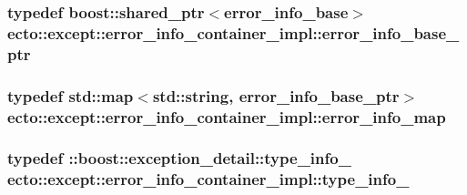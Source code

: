\subsubsection[{error\+\_\+info\+\_\+base\+\_\+ptr}]{\setlength{\rightskip}{0pt plus 5cm}typedef boost\+::shared\+\_\+ptr$<${\bf error\+\_\+info\+\_\+base}$>$ {\bf ecto\+::except\+::error\+\_\+info\+\_\+container\+\_\+impl\+::error\+\_\+info\+\_\+base\+\_\+ptr}\hspace{0.3cm}{\ttfamily [private]}}\label{classecto_1_1except_1_1error__info__container__impl_a9fbca0758380cb123f790aee77d1d4d8}
\hypertarget{classecto_1_1except_1_1error__info__container__impl_a20b3846bc393224fe282eb64a40ee83d}{}
\subsubsection[{error\+\_\+info\+\_\+map}]{\setlength{\rightskip}{0pt plus 5cm}typedef std\+::map$<$std\+::string, {\bf error\+\_\+info\+\_\+base\+\_\+ptr}$>$ {\bf ecto\+::except\+::error\+\_\+info\+\_\+container\+\_\+impl\+::error\+\_\+info\+\_\+map}\hspace{0.3cm}{\ttfamily [private]}}\label{classecto_1_1except_1_1error__info__container__impl_a20b3846bc393224fe282eb64a40ee83d}
\hypertarget{classecto_1_1except_1_1error__info__container__impl_abe4f51bf533842a5e0b81f3e43ae6267}{}
\subsubsection[{type\+\_\+info\+\_\+}]{\setlength{\rightskip}{0pt plus 5cm}typedef \+::boost\+::exception\+\_\+detail\+::type\+\_\+info\+\_\+ {\bf ecto\+::except\+::error\+\_\+info\+\_\+container\+\_\+impl\+::type\+\_\+info\+\_\+}\hspace{0.3cm}{\ttfamily [private]}}\label{classecto_1_1except_1_1error__info__container__impl_abe4f51bf533842a5e0b81f3e43ae6267}


